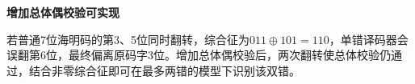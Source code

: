 {\color{ink}\bfseries 增加总体偶校验可实现}\par\vspace{1bp}若普通7位海明码的第3、5位同时翻转，综合征为\(011\oplus 101=\allowbreak{}110\)，单错译码器会误翻第6位，最终偏离原码字3位。增加总体偶校验后，两次翻转使总体校验仍通过，结合非零综合征即可在最多两错的模型下识别该双错。
